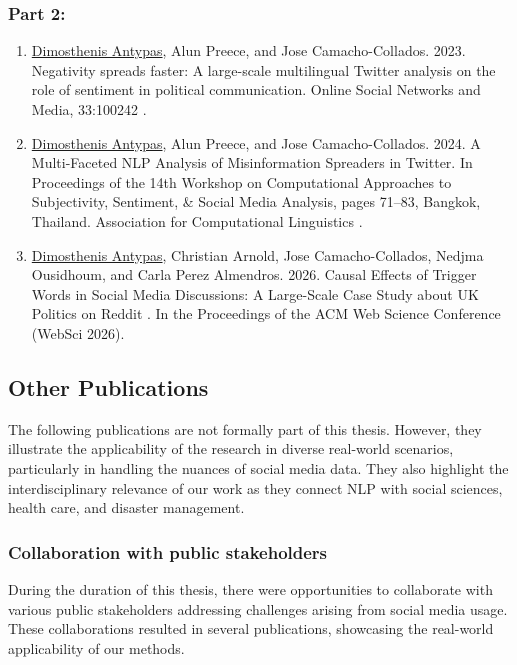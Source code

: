 \subsubsection{Part 2: \PARTTWO} \label{ch:intro:publications:parttwo}
\begin{enumerate}[start=5]
    \item \label{publication:5} \underline{Dimosthenis Antypas}, Alun Preece, and Jose Camacho-Collados. 2023. Negativity spreads faster: A large-scale multilingual Twitter analysis on the role of sentiment in political communication. Online Social Networks and Media, 33:100242 \cite{antypas2023negativity}. 

    \item \label{publication:6} \underline{Dimosthenis Antypas}, Alun Preece, and Jose Camacho-Collados. 2024. A Multi-Faceted NLP Analysis of Misinformation Spreaders in Twitter. In Proceedings of the 14th Workshop on Computational Approaches to Subjectivity, Sentiment, \& Social Media Analysis, pages 71–83, Bangkok, Thailand. Association for Computational Linguistics \cite{antypas-etal-2024-multi}. 

    \item \label{publication:7} \underline{Dimosthenis Antypas}, Christian Arnold, Jose Camacho-Collados, Nedjma Ousidhoum, and Carla Perez Almendros. 2026. Causal Effects of Trigger Words in Social Media Discussions: A Large-Scale Case Study about UK Politics on Reddit \cite{triggerwords2026}. In the Proceedings of the ACM Web Science Conference (WebSci 2026). 
\end{enumerate}


\subsection{Other Publications}
The following publications are not formally part of this thesis. However, they illustrate the applicability of the research in diverse real-world scenarios, particularly in handling the nuances of social media data. They also highlight the interdisciplinary relevance of our work as they connect \ac{NLP} with social sciences, health care, and disaster management.

\subsubsection{Collaboration with public stakeholders}\label{ch1:sec:collaboration}
During the duration of this thesis, there were opportunities to collaborate with various public stakeholders addressing challenges arising from social media usage. These collaborations resulted in several publications, showcasing the real-world applicability of our methods.
 
